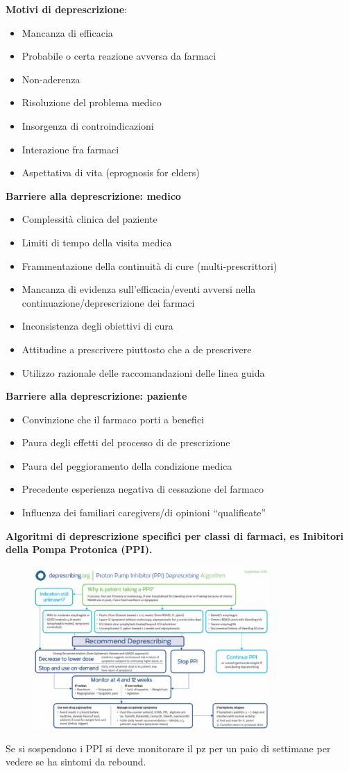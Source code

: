   \textbf{Motivi di deprescrizione}:

\begin{itemize}
\item
  Mancanza di efficacia
\item
  Probabile o certa reazione avversa da farmaci
\item
  Non-aderenza
\item
  Risoluzione del problema medico
\item
  Insorgenza di controindicazioni
\item
  Interazione fra farmaci
\item
  Aspettativa di vita (eprognosis for elders)
\end{itemize}

  \textbf{Barriere alla deprescrizione: medico}

\begin{itemize}
\item
  Complessità clinica del paziente
\item
  Limiti di tempo della visita medica
\item
  Frammentazione della continuità di cure (multi-prescrittori)
\item
  Mancanza di evidenza sull'efficacia/eventi avversi nella
  continuazione/deprescrizione dei farmaci
\item
  Inconsistenza degli obiettivi di cura
\item
  Attitudine a prescrivere piuttosto che a de prescrivere
\item
  Utilizzo razionale delle raccomandazioni delle linea guida
\end{itemize}
  
  \textbf{Barriere alla deprescrizione: paziente}

\begin{itemize}
\item
  Convinzione che il farmaco porti a benefici
\item
  Paura degli effetti del processo di de prescrizione
\item
  Paura del peggioramento della condizione medica
\item
  Precedente esperienza negativa di cessazione del farmaco
\item
  Influenza dei familiari caregivers/di opinioni ``qualificate''
\end{itemize}

  \textbf{Algoritmi di deprescrizione specifici per classi di farmaci,
  es Inibitori della Pompa Protonica (PPI).}

  \begin{figure}[!ht]
\centering
	\includegraphics[width=0.8\textwidth]{37/image5.jpg}
	\end{figure}

  Se si sospendono i PPI si deve monitorare il pz per un paio di
  settimane per vedere se ha sintomi da rebound.